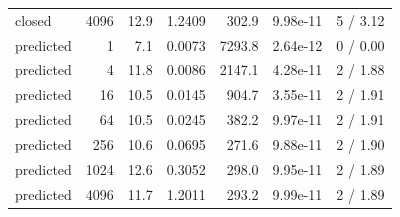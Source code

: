 \begin{tabular}{lrrrrrr}
closed & 4096 & 12.9 & 1.2409 & 302.9 & 9.98e-11 & 5 / 3.12 \\
predicted & 1 & 7.1 & 0.0073 & 7293.8 & 2.64e-12 & 0 / 0.00 \\
predicted & 4 & 11.8 & 0.0086 & 2147.1 & 4.28e-11 & 2 / 1.88 \\
predicted & 16 & 10.5 & 0.0145 & 904.7 & 3.55e-11 & 2 / 1.91 \\
predicted & 64 & 10.5 & 0.0245 & 382.2 & 9.97e-11 & 2 / 1.91 \\
predicted & 256 & 10.6 & 0.0695 & 271.6 & 9.88e-11 & 2 / 1.90 \\
predicted & 1024 & 12.6 & 0.3052 & 298.0 & 9.95e-11 & 2 / 1.89 \\
predicted & 4096 & 11.7 & 1.2011 & 293.2 & 9.99e-11 & 2 / 1.89 \\
\bottomrule
\end{tabular}
